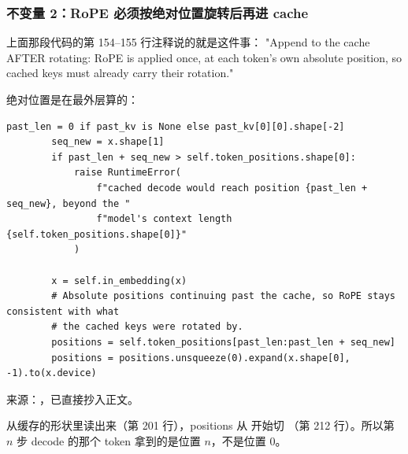 \subsubsection{不变量 2：RoPE 必须按绝对位置旋转后再进 cache}

上面那段代码的第 154--155 行注释说的就是这件事：
"Append to the cache AFTER rotating: RoPE is applied once, at each token's own absolute
position, so cached keys must already carry their rotation."

绝对位置是在最外层算的：

\begin{lstlisting}[style=hlnum, firstnumber=201]
        past_len = 0 if past_kv is None else past_kv[0][0].shape[-2]
        seq_new = x.shape[1]
        if past_len + seq_new > self.token_positions.shape[0]:
            raise RuntimeError(
                f"cached decode would reach position {past_len + seq_new}, beyond the "
                f"model's context length {self.token_positions.shape[0]}"
            )

        x = self.in_embedding(x)
        # Absolute positions continuing past the cache, so RoPE stays consistent with what
        # the cached keys were rotated by.
        positions = self.token_positions[past_len:past_len + seq_new]
        positions = positions.unsqueeze(0).expand(x.shape[0], -1).to(x.device)
\end{lstlisting}
\noindent 来源：，已直接抄入正文。

 从缓存的形状里读出来（第 201 行），positions 从  开始切
（第 212 行）。所以第 $n$ 步 decode 的那个 token 拿到的是位置 $n$，不是位置 0。

